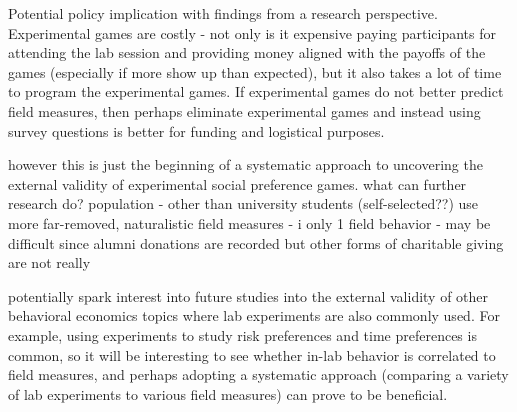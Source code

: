 \documentclass[12pt]{article}
\begin{document}
Potential policy implication with findings from a research perspective. Experimental games are costly - not only is it expensive paying participants for attending the lab session and providing money aligned with the payoffs of the games (especially if more show up than expected), but it also takes a lot of time to program the experimental games. If experimental games do not better predict field measures, then perhaps eliminate experimental games and instead using survey questions is better for funding and logistical purposes. 

however this is just the beginning of a systematic approach to uncovering the external validity of experimental social preference games. what can further research do?
population - other than university students (self-selected??)
use more far-removed, naturalistic field measures - i only 1 field behavior - may be difficult since alumni donations are recorded but other forms of charitable giving are not really

potentially spark interest into future studies into the external validity of other behavioral economics topics where lab experiments are also commonly used. For example, using experiments to study risk preferences and time preferences is common, so it will be interesting to see whether in-lab behavior is correlated to field measures, and perhaps adopting a systematic approach (comparing a variety of lab experiments to various field measures) can prove to be beneficial.
\end{document}

